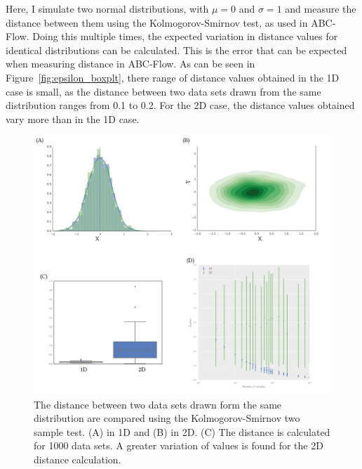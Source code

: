 Here, I simulate two normal distributions, with $\mu=0$ and $\sigma=1$ and measure the distance between them using the Kolmogorov-Smirnov test, as used in ABC-Flow. Doing this multiple times, the expected variation in distance values for identical distributions can be calculated. This is the error that can be expected when measuring distance in ABC-Flow. As can be seen in Figure~\ref{fig:epsilon_boxplt}, there range of distance values obtained in the 1D case is small, as the distance between two data sets drawn from the same distribution ranges from 0.1 to 0.2. For the 2D case, the distance values obtained vary more than in the 1D case. 


\begin{figure}[htbp]
\centering
\includegraphics[scale=0.7]{../../chapters/chapterABCFlow/images/epsilon_same_box.png}
\caption[LoF caption]{\label{fig:epsilon_boxplt} The distance between two data sets drawn form the same distribution are compared using the Kolmogorov-Smirnov two sample test. (A) in 1D and (B) in 2D. (C) The distance is calculated for 1000 data sets. A greater variation of values is found for the 2D distance calculation.  }
\label{fig:normal_example}
\end{figure}
\clearpage


